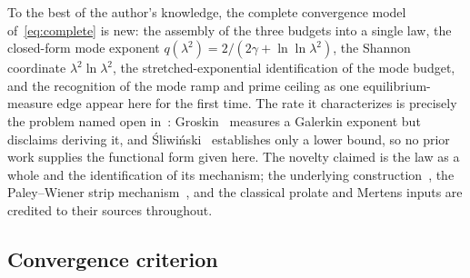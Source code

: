 \documentclass[11pt,a4paper]{article}
\begin{document}
To the best of the author's knowledge, the complete convergence model
of~\eqref{eq:complete} is new: the assembly of the three budgets into a single law, the closed-form
mode exponent $q(\lambda^2)=2/(2\gamma+\ln\ln\lambda^2)$, the Shannon coordinate
$\lambda^2\ln\lambda^2$, the stretched-exponential identification of the mode
budget, and the recognition of the mode ramp and prime ceiling as one
equilibrium-measure edge appear here for the first time. The rate it characterizes is precisely the
problem named open in~\cite{CCM2025}: Groskin~\cite{Groskin2026} measures a
Galerkin exponent but disclaims deriving it, and \'Sliwi\'nski~\cite{Sliwinski2026}
establishes only a lower bound, so no prior work supplies the functional form
given here. The novelty claimed is the law as a whole and the identification of
its mechanism; the underlying construction~\cite{CCM2025,CvS2025}, the
Paley--Wiener strip mechanism~\cite{Groskin2026}, and the classical prolate and
Mertens inputs are credited to their sources throughout.

\subsection{Convergence criterion}\label{ssec:criterion}
\end{document}

